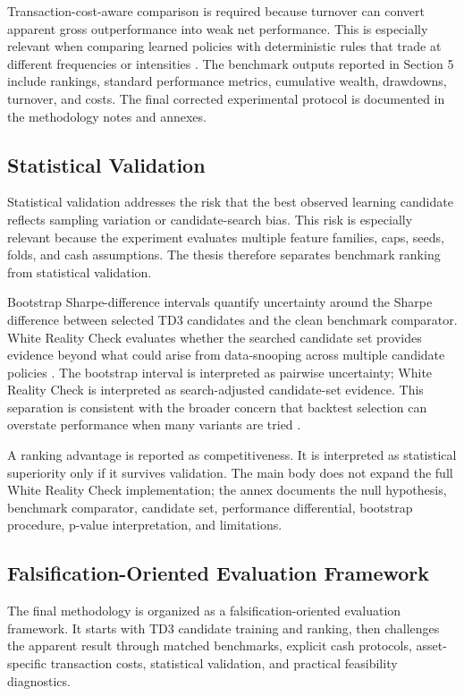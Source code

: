 \documentclass[12pt]{article}
\begin{document}
Transaction-cost-aware comparison is required because turnover can convert apparent gross outperformance into weak net performance. This is especially relevant when comparing learned policies with deterministic rules that trade at different frequencies or intensities \citep{novymarx2016}. The benchmark outputs reported in Section 5 include rankings, standard performance metrics, cumulative wealth, drawdowns, turnover, and costs. The final corrected experimental protocol is documented in the methodology notes and annexes.

\subsection{Statistical Validation}

Statistical validation addresses the risk that the best observed learning candidate reflects sampling variation or candidate-search bias. This risk is especially relevant because the experiment evaluates multiple feature families, caps, seeds, folds, and cash assumptions. The thesis therefore separates benchmark ranking from statistical validation.

Bootstrap Sharpe-difference intervals quantify uncertainty around the Sharpe difference between selected TD3 candidates and the clean benchmark comparator. White Reality Check evaluates whether the searched candidate set provides evidence beyond what could arise from data-snooping across multiple candidate policies \citep{white2000}. The bootstrap interval is interpreted as pairwise uncertainty; White Reality Check is interpreted as search-adjusted candidate-set evidence. This separation is consistent with the broader concern that backtest selection can overstate performance when many variants are tried \citep{bailey2014,lopezdeprado2020mlam}.

A ranking advantage is reported as competitiveness. It is interpreted as statistical superiority only if it survives validation. The main body does not expand the full White Reality Check implementation; the annex documents the null hypothesis, benchmark comparator, candidate set, performance differential, bootstrap procedure, p-value interpretation, and limitations.

\subsection{Falsification-Oriented Evaluation Framework}

The final methodology is organized as a falsification-oriented evaluation framework. It starts with TD3 candidate training and ranking, then challenges the apparent result through matched benchmarks, explicit cash protocols, asset-specific transaction costs, statistical validation, and practical feasibility diagnostics.
\end{document}
